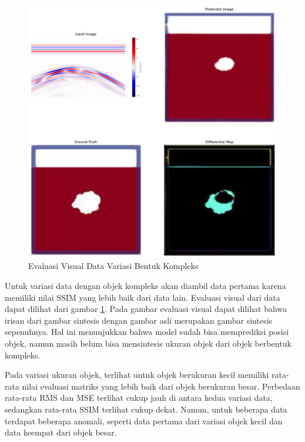 \documentclass[conference]{IEEEtran}
\begin{document}
\begin{figure}[ht]
  \centering
  \includegraphics[scale=0.15]{gambar/diffMapKompleks.jpg}
  \caption{Evaluasi Visual Data Variasi Bentuk Kompleks}
  \label{fig:diffmapkompleks}
\end{figure}

Untuk variasi data dengan objek kompleks akan diambil data pertama karena memiliki nilai SSIM yang lebih baik dari data lain. 
Evaluasi visual dari data dapat dilihat dari gambar \ref{fig:diffmapkompleks}. 
Pada gambar evaluasi visual dapat dilihat bahwa irisan dari gambar sintesis dengan gambar asli merupakan gambar sintesis sepenuhnya. 
Hal ini menunjukkan bahwa model sudah bisa memprediksi posisi objek, namun masih belum bisa mensintesis ukuran objek dari objek berbentuk kompleks.

Pada variasi ukuran objek, terlihat untuk objek berukuran kecil memiliki rata-rata nilai evaluasi matriks yang lebih baik dari objek berukuran besar. 
Perbedaan rata-rata RMS dan MSE terlihat cukup jauh di antara kedua variasi data, sedangkan rata-rata SSIM terlihat cukup dekat. 
Namun, untuk beberapa data terdapat beberapa anomali, seperti data pertama dari variasi objek kecil dan data keempat dari objek besar. 
\end{document}
